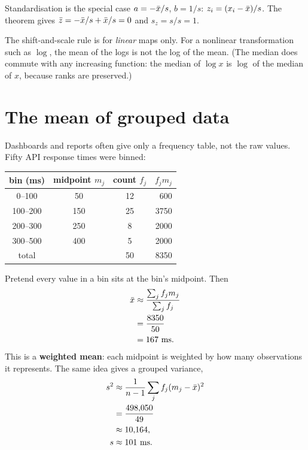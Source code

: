 Standardisation is the special case $a = -\bar{x}/s$, $b = 1/s$:
$z_i = (x_i - \bar{x})/s$. The theorem gives $\bar z = -\bar{x}/s + \bar{x}/s = 0$ and
$s_z = s/s = 1$.

\begin{trapbox}
The shift-and-scale rule is for \emph{linear} maps only. For a nonlinear
transformation such as $\log$, the mean of the logs is not the log of the mean.
(The median does commute with any increasing function: the median of $\log x$ is
$\log$ of the median of $x$, because ranks are preserved.)
\end{trapbox}

\section{The mean of grouped data}
\label{sec:center-spread-grouped}

Dashboards and reports often give only a frequency table, not the raw values. Fifty
API response times were binned:

\begin{center}
\begin{tabular}{c c c r}
\toprule
bin (ms) & midpoint $m_j$ & count $f_j$ & $f_j m_j$ \\
\midrule
0--100   & 50  & 12 & 600 \\
100--200 & 150 & 25 & 3750 \\
200--300 & 250 & 8  & 2000 \\
300--500 & 400 & 5  & 2000 \\
\midrule
total    &     & 50 & 8350 \\
\bottomrule
\end{tabular}
\end{center}

Pretend every value in a bin sits at the bin's midpoint. Then
\begin{align*}
  \bar{x} &\approx \frac{\sum_j f_j m_j}{\sum_j f_j} \\
        &= \frac{8350}{50} \\
        &= 167 \text{ ms}.
\end{align*}
This is a \textbf{weighted mean}: each midpoint is weighted by how many observations
it represents. The same idea gives a grouped variance,
\begin{align*}
  s^2 &\approx \frac{1}{n-1}\sum_j f_j (m_j - \bar{x})^2 \\
      &= \frac{498{,}050}{49} \\
      &\approx 10{,}164, \\
  s &\approx 101 \text{ ms}.
\end{align*}

